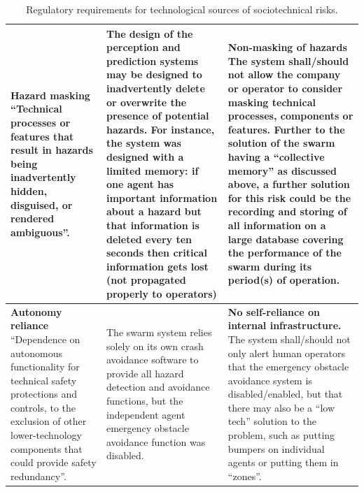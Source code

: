 \documentclass[lettersize,journal]{IEEEtran}
\begin{document}
\begin{landscape}
\begin{table}[]
\begin{tabular}{|p{0.3\textheight}|p{0.35\textheight}|p{0.35\textheight}|}
        \textbf{Hazard masking} ``Technical processes or features that result in hazards being inadvertently hidden, disguised, or rendered ambiguous”. \cite{macrae2021learning} & The design of the perception and prediction systems may be designed to inadvertently delete or overwrite the presence of potential hazards. For instance, the system was designed with a limited memory: if one agent has important information about a hazard but that information is deleted every ten seconds then critical information gets lost (not propagated properly to operators) & \textbf{Non-masking of hazards} The system shall/should not allow the company or operator to consider masking technical processes, components or features. Further to the solution of the swarm having a ``collective memory” \cite{wilson2022information} as discussed above, a further solution for this risk could be the recording and storing of all information on a large database covering the performance of the swarm during its period(s) of operation.\\
        \hline
        \textbf{Autonomy reliance } ``Dependence on autonomous functionality for technical safety protections and controls, to the exclusion of other lower-technology components that could provide safety redundancy”. \cite{macrae2021learning} & The swarm system relies solely on its own crash avoidance software to provide all hazard detection and avoidance functions, but the independent agent emergency obstacle avoidance function was disabled. &	\textbf{No self-reliance on internal infrastructure.} The system shall/should not only alert human operators that the emergency obstacle avoidance system is disabled/enabled, but that there may also be a ``low tech” solution to the problem, such as putting bumpers on individual agents or putting them in ``zones”.\\
        \hline
    \end{tabular}
    \caption{Regulatory requirements for technological sources of sociotechnical risks.}%
    \label{tab:reg_3}
\end{table}
\end{landscape}
\end{document}
